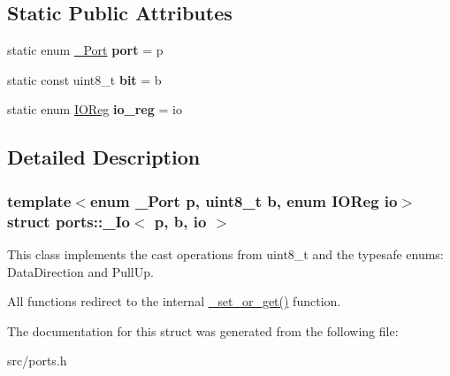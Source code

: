 \subsection*{Static Public Attributes}
\begin{DoxyCompactItemize}
\item 
\hypertarget{structports_1_1__Io_adad70155dd6893a33058c00b39a61868}{}\label{structports_1_1__Io_adad70155dd6893a33058c00b39a61868} 
static enum \hyperlink{namespaceports_a9949317f344930bd6ad1097e80c97b67}{\+\_\+\+Port} {\bfseries port} = p
\item 
\hypertarget{structports_1_1__Io_ab6ad4e5dabbb7a274ef5299a9bdb094f}{}\label{structports_1_1__Io_ab6ad4e5dabbb7a274ef5299a9bdb094f} 
static const uint8\+\_\+t {\bfseries bit} = b
\item 
\hypertarget{structports_1_1__Io_acdb506a481ed44079a6fff95374b5852}{}\label{structports_1_1__Io_acdb506a481ed44079a6fff95374b5852} 
static enum \hyperlink{namespaceports_aca1f1af9f1af73e71c6954b7dfb1bfa1}{I\+O\+Reg} {\bfseries io\+\_\+reg} = io
\end{DoxyCompactItemize}


\subsection{Detailed Description}
\subsubsection*{template$<$enum \+\_\+\+Port p, uint8\+\_\+t b, enum I\+O\+Reg io$>$\newline
struct ports\+::\+\_\+\+Io$<$ p, b, io $>$}

This class implements the cast operations from uint8\+\_\+t and the typesafe enums\+: Data\+Direction and Pull\+Up. 

All functions redirect to the internal \hyperlink{namespaceports_aa339a9d178cb414c4cf243450d5887d2}{\+\_\+set\+\_\+or\+\_\+get()} function. 

The documentation for this struct was generated from the following file\+:\begin{DoxyCompactItemize}
\item 
src/ports.\+h\end{DoxyCompactItemize}

